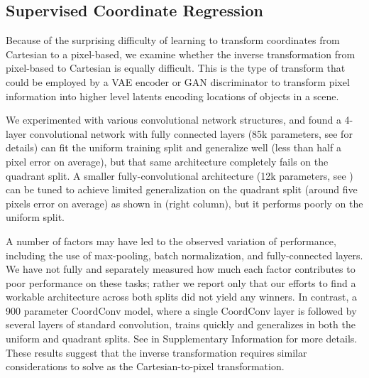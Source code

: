 \documentclass{article}
\begin{document}
\vspace*{-.6em}
\subsection{Supervised Coordinate Regression}
\vspace*{-.6em}

Because of the surprising difficulty of learning to transform coordinates from Cartesian to a pixel-based, we examine whether the inverse transformation from pixel-based to Cartesian is equally difficult.
This is the type of transform that could be employed by a VAE encoder or GAN discriminator to transform pixel information into higher level latents encoding locations of objects in a scene.


We experimented with various convolutional network structures, and found a 4-layer convolutional network with fully connected layers (85k parameters, see  for details) can fit the uniform training split
and generalize well (less than half a pixel error on average), but that same architecture completely fails on the quadrant split. 
A smaller fully-convolutional architecture (12k parameters, see ) can be tuned to achieve limited
generalization on the quadrant split (around five pixels error on average) as shown in  (right column), but it performs poorly on the uniform split.


A number of factors may have led to the observed variation of performance, including the use of max-pooling, batch normalization, and fully-connected layers.
We have not fully and separately measured how much each factor contributes to poor performance on these tasks;
rather we report only that our efforts to find a workable architecture across both splits did not yield any winners.
In contrast, a 900 parameter CoordConv model, where a single CoordConv layer is followed by several layers of standard convolution,
trains quickly and generalizes in both the uniform and quadrant splits. See  in Supplementary Information for more details. These results suggest that the inverse transformation requires similar considerations to solve as the Cartesian-to-pixel transformation.
\end{document}
